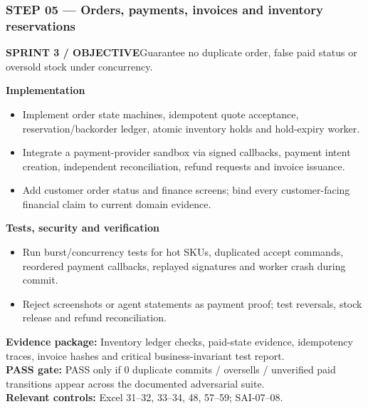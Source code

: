 \documentclass[10.5pt,a4paper,oneside]{article}
\newcommand{\eyebrow}[1]{{\sffamily\footnotesize\bfseries\color{gold}\MakeUppercase{#1}}}
\begin{document}
\subsubsection*{STEP 05 --- Orders, payments, invoices and inventory reservations}
\eyebrow{Sprint 3 / objective}\quad Guarantee no duplicate order, false paid status or oversold stock under concurrency.
\begin{tcolorbox}[colback=warm,colframe=line,boxrule=.45pt,arc=2pt,left=8pt,right=8pt,top=6pt,bottom=6pt]\textbf{Implementation}
\begin{itemize}
\item Implement order state machines, idempotent quote acceptance, reservation/backorder ledger, atomic inventory holds and hold-expiry worker.
\item Integrate a payment-provider sandbox via signed callbacks, payment intent creation, independent reconciliation, refund requests and invoice issuance.
\item Add customer order status and finance screens; bind every customer-facing financial claim to current domain evidence.
\end{itemize}
\textbf{Tests, security and verification}
\begin{itemize}
\item Run burst/concurrency tests for hot SKUs, duplicated accept commands, reordered payment callbacks, replayed signatures and worker crash during commit.
\item Reject screenshots or agent statements as payment proof; test reversals, stock release and refund reconciliation.
\end{itemize}
\textbf{Evidence package:} Inventory ledger checks, paid-state evidence, idempotency traces, invoice hashes and critical business-invariant test report.\\
\textbf{PASS gate:} PASS only if 0 duplicate commits / oversells / unverified paid transitions appear across the documented adversarial suite.\\
\textbf{Relevant controls:} Excel 31--32, 33--34, 48, 57--59; SAI-07--08.
\end{tcolorbox}
\Needspace{100mm}
\end{document}
